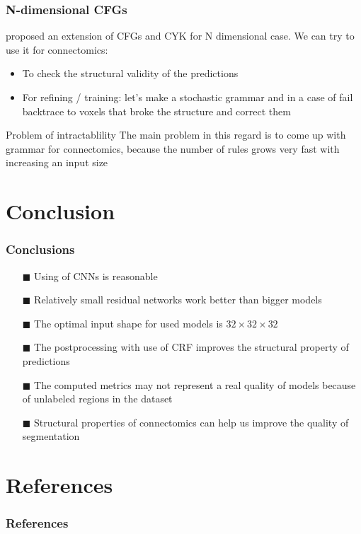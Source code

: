 \documentclass{beamer}
\begin{document}
\begin{frame}
    \frametitle{N-dimensional CFGs}
    \cite{schlesinger2013ten} proposed an extension of CFGs and CYK for N dimensional case. We can try to use it
    for connectomics:
    \begin{itemize}
        \item To check the structural validity of the predictions
        \item For refining / training: let's make a stochastic grammar and in a case of fail backtrace to
              voxels that broke the structure and correct them
    \end{itemize}
    \begin{alertblock}{Problem of intractablility}
        The main problem in this regard is to come up with grammar for connectomics, because the
        number of rules grows very fast with increasing an input size
    \end{alertblock}
\end{frame}

\section*{Conclusion}

\begin{frame}
    \frametitle{Conclusions}

    \begin{itemize}
        \item[$\blacksquare$] Using of CNNs is reasonable
        \item[$\blacksquare$] Relatively small residual networks work better than bigger models
        \item[$\blacksquare$] The optimal input shape for used models is \( 32 \times 32 \times 32 \)
        \item[$\blacksquare$] The postprocessing with use of CRF improves the structural property of predictions
        \item[$\blacksquare$] The computed metrics may not represent a real quality of models because of
              unlabeled regions in the dataset
        \item[$\blacksquare$] Structural properties of connectomics
              can help us improve the quality of segmentation
    \end{itemize}

\end{frame}

\section*{References}

\begin{frame}[allowframebreaks]
    \frametitle{References}

    
    
\end{frame}
\end{document}
